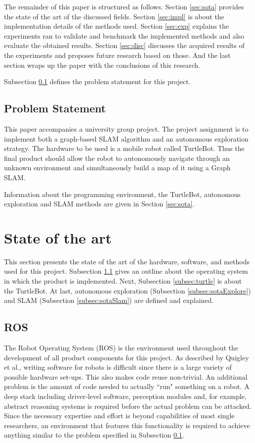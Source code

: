\documentclass{ba-kecs}
\begin{document}
The remainder of this paper is structured as follows. Section \ref{sec:sota} provides the state of the art of the discussed fields. Section \ref{sec:impl} is about the implementation details of the methods used. Section \ref{sec:exp} explains the experiments ran to validate and benchmark the implemented methods and also evaluate the obtained results. Section \ref{sec:disc} discusses the acquired results of the experiments and proposes future research based on those. And the last section wraps up the paper with the conclusions of this research.

Subsection \ref{sec:problem} defines the problem statement for this project.
\subsection{Problem Statement}
\label{sec:problem}
This paper accompanies a university group project. The project assignment is to implement both a graph-based SLAM algorithm and an autonomous exploration strategy. The hardware to be used is a mobile robot called TurtleBot. Thus the final product should allow the robot to autonomously navigate through an unknown environment and simultaneously build a map of it using a Graph SLAM.

Information about the programming environment, the TurtleBot, autonomous exploration and SLAM methods are given in Section \ref{sec:sota}.  

\section{State of the art}
This section presents the state of the art of the hardware, software, and methods used for this project. Subsection \ref{subsec:ros} gives an outline about the operating system in which the product is implemented. Next, Subsection \ref{subsec:turtle} is about the TurtleBot. At last, autonomous exploration (Subsection \ref{subsec:sotaExplore}) and SLAM (Subsection \ref{subsec:sotaSlam}) 
\label{sec:sota} are defined and explained.
\subsection{ROS}
\label{subsec:ros}
The Robot Operating System (ROS) \cite{Quigley} is the environment used throughout the development of all product components for this project. As described by Quigley et al., writing software for robots is difficult since there is a large variety of possible hardware set-ups. This also makes code reuse non-trivial. An additional problem is the amount of code needed to actually ``run" something on a robot. A deep stack including driver-level software, perception modules and, for example, abstract reasoning systems is required before the actual problem can be attacked. Since the necessary expertise and effort is beyond capabilities of most single researchers, an environment that features this functionality is required to achieve anything similar to the problem specified in Subsection \ref{sec:problem}.
\end{document}
